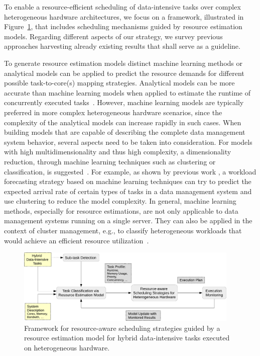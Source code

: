 \documentclass[11pt,dvipdfm]{article}
\newcommand{\reffig}[1]{Figure~\ref{fig:#1}}
\begin{document}
To enable a resource-efficient scheduling of data-intensive tasks over complex heterogeneous hardware architectures,
we focus on a framework, illustrated in \reffig{framework},
that includes scheduling mechanisms guided by resource estimation models.
Regarding different aspects of our strategy,
we survey previous approaches harvesting already existing results that shall serve as a guideline.

To generate resource estimation models distinct machine learning methods or analytical models
can be applied to predict the resource demands for different possible task-to-core(s) mapping strategies.
Analytical models can be more accurate than machine learning models
when applied to estimate the runtime of concurrently executed tasks~\cite{Wu_2013}.
However,
machine learning models are typically preferred in more complex heterogeneous hardware scenarios,
since the complexity of the analytical models can increase rapidly in such cases. 
When building models that are capable of describing the complete data management system behavior,
several aspects need to be taken into consideration.
For models with high multidimensionality and thus high complexity,
a dimensionality reduction, through machine learning techniques such as clustering or classification,
is suggested~\cite{Chen_2011}.
For example, as shown by previous work \cite{Ma_2018},
a workload forecasting strategy based on machine learning techniques can try to predict
the expected arrival rate of certain types of tasks in a data management system
and use clustering to reduce the model complexity.
In general, machine learning methods, especially for resource estimations,
are not only applicable to data management systems running on a single server.
They can also be applied in the context of cluster management,
e.g., to classify heterogeneous workloads that would achieve an efficient resource utilization~\cite{Delimitrou_2014}.

\begin{figure}
	\centering
	\includegraphics[width=0.95\textwidth]{figs/fig-framework.pdf}
	\caption{Framework for resource-aware scheduling strategies guided by a resource estimation model for hybrid data-intensive tasks executed on heterogeneous hardware.}
	\label{fig:framework}
\end{figure}
\end{document}
